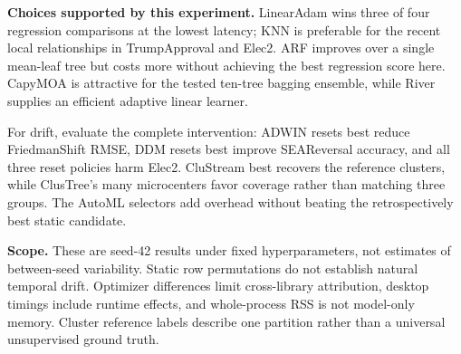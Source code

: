 \textbf{Choices supported by this experiment.} LinearAdam wins three of four regression comparisons at the lowest latency; KNN is preferable for the recent local relationships in TrumpApproval and Elec2. ARF improves over a single mean-leaf tree but costs more without achieving the best regression score here. CapyMOA is attractive for the tested ten-tree bagging ensemble, while River supplies an efficient adaptive linear learner.

For drift, evaluate the complete intervention: ADWIN resets best reduce FriedmanShift RMSE, DDM resets best improve SEAReversal accuracy, and all three reset policies harm Elec2. CluStream best recovers the reference clusters, while ClusTree's many microcenters favor coverage rather than matching three groups. The AutoML selectors add overhead without beating the retrospectively best static candidate.

\textbf{Scope.} These are seed-42 results under fixed hyperparameters, not estimates of between-seed variability. Static row permutations do not establish natural temporal drift. Optimizer differences limit cross-library attribution, desktop timings include runtime effects, and whole-process RSS is not model-only memory. Cluster reference labels describe one partition rather than a universal unsupervised ground truth.
